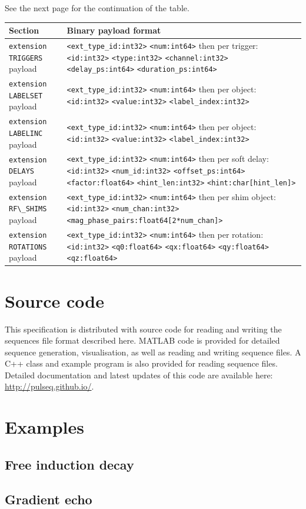 \documentclass{article}
\begin{document}
See the next page for the continuation of the table.
\begin{center}
\begin{tabularx}{\textwidth}{lX}
\toprule
Section & Binary payload format \\
\midrule
\verb.extension TRIGGERS. payload & \verb.<ext_type_id:int32>. \verb.<num:int64>. then per trigger: \verb.<id:int32>. \verb.<type:int32>. \verb.<channel:int32>. \verb.<delay_ps:int64>. \verb.<duration_ps:int64>. \\
\verb.extension LABELSET. payload & \verb.<ext_type_id:int32>. \verb.<num:int64>. then per object: \verb.<id:int32>. \verb.<value:int32>. \verb.<label_index:int32>. \\
\verb.extension LABELINC. payload & \verb.<ext_type_id:int32>. \verb.<num:int64>. then per object: \verb.<id:int32>. \verb.<value:int32>. \verb.<label_index:int32>. \\
\verb.extension DELAYS. payload & \verb.<ext_type_id:int32>. \verb.<num:int64>. then per soft delay: \verb.<id:int32>. \verb.<num_id:int32>. \verb.<offset_ps:int64>. \verb.<factor:float64>. \verb.<hint_len:int32>. \verb.<hint:char[hint_len]>. \\
\verb.extension RF\_SHIMS. payload & \verb.<ext_type_id:int32>. \verb.<num:int64>. then per shim object: \verb.<id:int32>. \verb.<num_chan:int32>. \verb.<mag_phase_pairs:float64[2*num_chan]>. \\
\verb.extension ROTATIONS. payload & \verb.<ext_type_id:int32>. \verb.<num:int64>. then per rotation: \verb.<id:int32>. \verb.<q0:float64>. \verb.<qx:float64>. \verb.<qy:float64>. \verb.<qz:float64>. \\
\bottomrule
\end{tabularx}
\end{center}

\section{Source code}
This specification is distributed with source code for reading and writing the sequences file format described here. MATLAB code is provided for detailed sequence generation, visualisation, as well as reading and writing sequence files. A C++ class and example program is also provided for reading sequence files. Detailed documentation and latest updates of this code are available here: \url{http://pulseq.github.io/}.

\newpage
\section{Examples}

\subsection{Free induction decay}



\subsection{Gradient echo}


\end{document}

